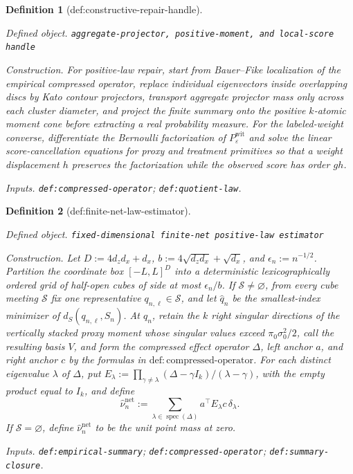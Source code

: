 \documentclass{article}
\newtheorem{definition}{Definition}
\begin{document}
\begin{definition}[def:constructive-repair-handle]\label{def:constructive-repair-handle}
\par\smallskip\noindent\emph{Defined object.} \texttt{aggregate-\allowbreak{}projector,\allowbreak{} positive-\allowbreak{}moment,\allowbreak{} and local-\allowbreak{}score handle}
\par\smallskip\noindent\emph{Construction.} For positive-law repair, start from Bauer--Fike localization of the empirical compressed operator, replace individual eigenvectors inside overlapping discs by Kato contour projectors, transport aggregate projector mass only across each cluster diameter, and project the finite summary onto the positive \(k\)-atomic moment cone before extracting a real probability measure. For the labeled-weight converse, differentiate the Bernoulli factorization of \(P_{\varepsilon}^{\mathrm{wit}}\) and solve the linear score-cancellation equations for proxy and treatment primitives so that a weight displacement \(h\) preserves the factorization while the observed score has order \(g h\).
\par\smallskip\noindent\emph{Inputs.} \texttt{def:\allowbreak{}compressed-\allowbreak{}operator}; \texttt{def:\allowbreak{}quotient-\allowbreak{}law}.
\end{definition}

\begin{definition}[def:finite-net-law-estimator]\label{def:finite-net-law-estimator}
\par\smallskip\noindent\emph{Defined object.} \texttt{fixed-\allowbreak{}dimensional finite-\allowbreak{}net positive-\allowbreak{}law estimator}
\par\smallskip\noindent\emph{Construction.} Let \(D:=4d_zd_x+d_x\), \(b:=4\sqrt{d_zd_x}+\sqrt{d_x}\), and \(\epsilon_n:=n^{-1/2}\).  Partition the coordinate box \([-L,L]^D\) into a deterministic lexicographically ordered grid of half-open cubes of side at most \(\epsilon_n/b\).  If \(\mathscr S\ne\varnothing\), from every cube meeting \(\mathscr S\) fix one representative \(q_{n,\ell}\in\mathscr S\), and let \(\widehat q_n\) be the smallest-index minimizer of \(d_S(q_{n,\ell},\widehat S_n)\).  At \(\widehat q_n\), retain the \(k\) right singular directions of the vertically stacked proxy moment whose singular values exceed \(\pi_0\sigma_0^2/2\), call the resulting basis \(V\), and form the compressed effect operator \(\Delta\), left anchor \(a\), and right anchor \(c\) by the formulas in \(\mathrm{def:compressed\text{-}operator}\).  For each distinct eigenvalue \(\lambda\) of \(\Delta\), put \(E_\lambda:=\prod_{\gamma\ne\lambda}(\Delta-\gamma I_k)/(\lambda-\gamma)\), with the empty product equal to \(I_k\), and define
\[
\widehat\nu_n^{\mathrm{net}}:=\sum_{\lambda\in\operatorname{spec}(\Delta)}a^\top E_\lambda c\,\delta_\lambda.
\]
If \(\mathscr S=\varnothing\), define \(\widehat\nu_n^{\mathrm{net}}\) to be the unit point mass at zero.
\par\smallskip\noindent\emph{Inputs.} \texttt{def:\allowbreak{}empirical-\allowbreak{}summary}; \texttt{def:\allowbreak{}compressed-\allowbreak{}operator}; \texttt{def:\allowbreak{}summary-\allowbreak{}closure}.
\end{definition}
\end{document}

